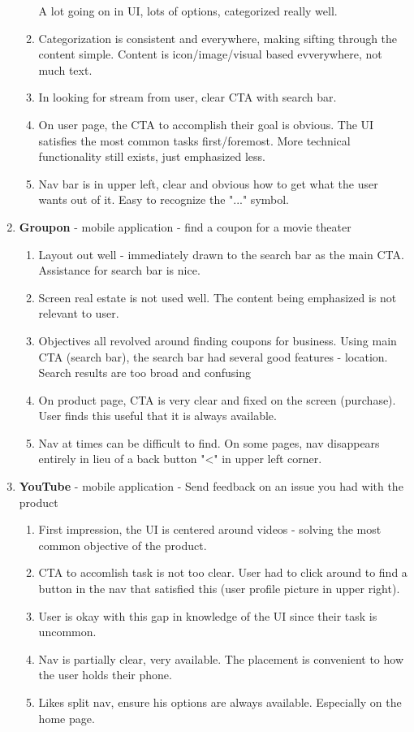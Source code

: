 \begin{enumerate}
\begin{enumerate}
    A lot going on in UI, lots of options, categorized really well.
  \item
    Categorization is consistent and everywhere, making sifting through the content simple. Content is icon/image/visual based evverywhere, not much text.
  \item
    In looking for stream from user, clear CTA with search bar.
  \item
    On user page, the CTA to accomplish their goal is obvious. The UI satisfies the most common tasks first/foremost. More technical functionality still exists, just emphasized less.
  \item
    Nav bar is in upper left, clear and obvious how to get what the user wants out of it. Easy to recognize the "..." symbol.
  \end{enumerate}
\item
  \textbf{Groupon} - mobile application - find a coupon for a movie theater
  \begin{enumerate}
  \item
    Layout out well - immediately drawn to the search bar as the main CTA. Assistance for search bar is nice.
  \item
    Screen real estate is not used well. The content being emphasized is not relevant to user.
  \item
    Objectives all revolved around finding coupons for business. Using main CTA (search bar), the search bar had several good features - location. Search results are too broad and confusing
  \item
    On product page, CTA is very clear and fixed on the screen (purchase). User finds this useful that it is always available.
  \item
    Nav at times can be difficult to find. On some pages, nav disappears entirely in lieu of a back button "<" in upper left corner.
  \end{enumerate}
\item
  \textbf{YouTube} - mobile application - Send feedback on an issue you had with the product
  \begin{enumerate}
  \item
    First impression, the UI is centered around videos - solving the most common objective of the product.
  \item
    CTA to accomlish task is not too clear. User had to click around to find a button in the nav that satisfied this (user profile picture in upper right).
  \item
    User is okay with this gap in knowledge of the UI since their task is uncommon.
  \item
    Nav is partially clear, very available. The placement is convenient to how the user holds their phone.
  \item
    Likes split nav, ensure his options are always available. Especially on the home page.
  \end{enumerate}
\end{enumerate}



